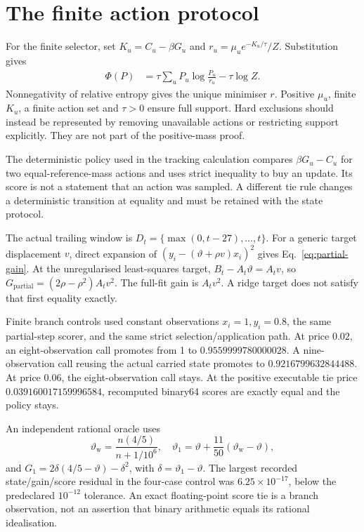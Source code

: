 \section{The finite action protocol}
\label{sec:yba-appendix}
\label{app:actions}

For the finite selector, set \(K_u=C_u-\beta G_u\) and
\(r_u=\mu_ue^{-K_u/\tau}/Z\). Substitution gives
\begin{align}
 \Phi(P)
 &=\tau\sum_uP_u\log\frac{P_u}{r_u}-\tau\log Z .
 \label{eq:selector-proof}
\end{align}
Nonnegativity of relative entropy gives the unique minimiser \(r\). Positive \(\mu_u\), finite \(K_u\), a finite action set and \(\tau>0\) ensure full support. Hard exclusions should instead be represented by removing unavailable actions or restricting support explicitly. They are not part of the positive-mass proof.

The deterministic policy used in the tracking calculation compares \(\beta G_u-C_u\) for two equal-reference-mass actions and uses strict inequality to buy an update. Its score is not a statement that an action was sampled. A different tie rule changes a deterministic transition at equality and must be retained with the state protocol.

The actual trailing window is
\(D_t=\{\max(0,t-27),\ldots,t\}\).
For a generic target displacement \(v\), direct expansion of
\((y_i-(\vartheta+\rho v)x_i)^2\) gives Eq.~\eqref{eq:partial-gain}. At the unregularised least-squares target,
\(B_t-A_t\vartheta=A_tv\), so
\(G_{\mathrm{partial}}=(2\rho-\rho^2)A_tv^2\).
The full-fit gain is \(A_tv^2\). A ridge target does not satisfy that first equality exactly.

Finite branch controls used constant observations \(x_i=1,y_i=0.8\), the same partial-step scorer, and the same strict selection/application path. At price \(0.02\), an eight-observation call promotes from 1 to \(0.9559999780000028\). A nine-observation call reusing the actual carried state promotes to \(0.9216799632844488\). At price \(0.06\), the eight-observation call stays. At the positive executable tie price \(0.039160017159996584\), recomputed binary64 scores are exactly equal and the policy stays.

An independent rational oracle uses
\[
 \vartheta_{\mathrm w}=\frac{n(4/5)}{n+1/10^6},\quad
 \vartheta_1=\vartheta+\frac{11}{50}(\vartheta_{\mathrm w}-\vartheta),
\]
and \(G_1=2\delta(4/5-\vartheta)-\delta^2\), with
\(\delta=\vartheta_1-\vartheta\).
The largest recorded state/gain/score residual in the four-case control was \(6.25\times10^{-17}\), below the predeclared \(10^{-12}\) tolerance. An exact floating-point score tie is a branch observation, not an assertion that binary arithmetic equals its rational idealisation.

